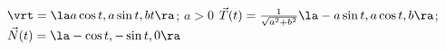 {$\vrt = \la a\cos t,a\sin t,b t \ra$; \quad $a>0$
}
{$\vec T(t) = \frac{1}{\sqrt{a^2+b^2}}\la -a\sin t,a\cos t,b \ra$; $\vec N(t) = \la  -\cos t,-\sin t,0\ra$
}